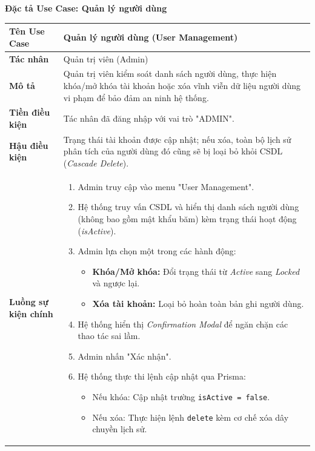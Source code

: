 \documentclass[12pt,a4paper]{article}
\begin{document}
\vspace{0.5cm}

\textbf{Đặc tả Use Case: Quản lý người dùng}

\begin{center}
\renewcommand{\arraystretch}{1.4}
\begin{tabular}{|p{4cm}|p{10cm}|}
\hline
\rowcolor{blue!15}
\textbf{Tên Use Case} & \textbf{Quản lý người dùng (User Management)} \\ \hline
\textbf{Tác nhân} & Quản trị viên (Admin) \\ \hline
\textbf{Mô tả} & Quản trị viên kiểm soát danh sách người dùng, thực hiện khóa/mở khóa tài khoản hoặc xóa vĩnh viễn dữ liệu người dùng vi phạm để bảo đảm an ninh hệ thống. \\ \hline
\textbf{Tiền điều kiện} & Tác nhân đã đăng nhập với vai trò "ADMIN". \\ \hline
\textbf{Hậu điều kiện} & Trạng thái tài khoản được cập nhật; nếu xóa, toàn bộ lịch sử phân tích của người dùng đó cũng sẽ bị loại bỏ khỏi CSDL (\textit{Cascade Delete}). \\ \hline
\textbf{Luồng sự kiện chính} & 
\begin{enumerate}
    \item Admin truy cập vào menu "User Management".
    \item Hệ thống truy vấn CSDL và hiển thị danh sách người dùng (không bao gồm mật khẩu băm) kèm trạng thái hoạt động (\textit{isActive}).
    \item Admin lựa chọn một trong các hành động:
        \begin{itemize}
            \item \textbf{Khóa/Mở khóa:} Đổi trạng thái từ \textit{Active} sang \textit{Locked} và ngược lại.
            \item \textbf{Xóa tài khoản:} Loại bỏ hoàn toàn bản ghi người dùng.
        \end{itemize}
    \item Hệ thống hiển thị \textit{Confirmation Modal} để ngăn chặn các thao tác sai lầm.
    \item Admin nhấn "Xác nhận".
    \item Hệ thống thực thi lệnh cập nhật qua Prisma:
        \begin{itemize}
            \item Nếu khóa: Cập nhật trường \texttt{isActive = false}.
            \item Nếu xóa: Thực hiện lệnh \texttt{delete} kèm cơ chế xóa dây chuyền lịch sử.

\end{itemize}
\end{enumerate}
\end{tabular}
\end{center}
\end{document}

